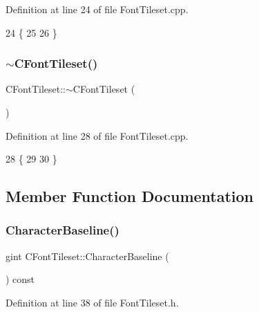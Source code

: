 Definition at line 24 of file Font\+Tileset.\+cpp.


\begin{DoxyCode}
24                           \{
25     
26 \}
\end{DoxyCode}
\hypertarget{classCFontTileset_a615232874cd33ae3d5f92ec836bf1f0b}{}\label{classCFontTileset_a615232874cd33ae3d5f92ec836bf1f0b} 
\subsubsection{\texorpdfstring{$\sim$\+C\+Font\+Tileset()}{~CFontTileset()}}
{\footnotesize\ttfamily C\+Font\+Tileset\+::$\sim$\+C\+Font\+Tileset (\begin{DoxyParamCaption}{ }\end{DoxyParamCaption})\hspace{0.3cm}{\ttfamily [virtual]}}



Definition at line 28 of file Font\+Tileset.\+cpp.


\begin{DoxyCode}
28                            \{
29 
30 \}
\end{DoxyCode}


\subsection{Member Function Documentation}
\hypertarget{classCFontTileset_a888dd4fe8f46b35550386a1997f4376a}{}\label{classCFontTileset_a888dd4fe8f46b35550386a1997f4376a} 
\subsubsection{\texorpdfstring{Character\+Baseline()}{CharacterBaseline()}}
{\footnotesize\ttfamily gint C\+Font\+Tileset\+::\+Character\+Baseline (\begin{DoxyParamCaption}{ }\end{DoxyParamCaption}) const\hspace{0.3cm}{\ttfamily [inline]}}



Definition at line 38 of file Font\+Tileset.\+h.




